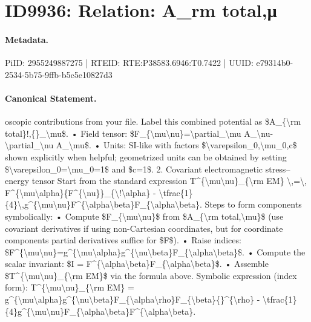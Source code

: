 \section*{ID9936: Relation: A\_rm total,μ}
\paragraph{Metadata.}
PiID: 2955249887275 | RTEID: RTE:P38583.6946:T0.7422 | UUID: e79314b0-2534-5b75-9ffb-b5c5e10827d3

\paragraph{Canonical Statement.}
oscopic contributions from your file. Label this combined potential as \$A\_\{\textbackslash{}rm total\}!,\{\}\_\textbackslash{}mu\$. • Field tensor: \$F\_\{\textbackslash{}mu\textbackslash{}nu\}=\textbackslash{}partial\_\textbackslash{}mu A\_\textbackslash{}nu-\textbackslash{}partial\_\textbackslash{}nu A\_\textbackslash{}mu\$. • Units: SI-like with factors \$\textbackslash{}varepsilon\_0,\textbackslash{}mu\_0,c\$ shown explicitly when helpful; geometrized units can be obtained by setting \$\textbackslash{}varepsilon\_0=\textbackslash{}mu\_0=1\$ and \$c=1\$. 2. Covariant electromagnetic stress–energy tensor Start from the standard expression T\textasciicircum{}\{\textbackslash{}mu\textbackslash{}nu\}\_\{\textbackslash{}rm EM\} \textbackslash{},=\textbackslash{}, F\textasciicircum{}\{\textbackslash{}mu\textbackslash{}alpha\}\{F\textasciicircum{}\{\textbackslash{}nu\}\}\_\{\textbackslash{}!\textbackslash{}alpha\} - \textbackslash{}tfrac\{1\}\{4\}\textbackslash{},g\textasciicircum{}\{\textbackslash{}mu\textbackslash{}nu\}F\textasciicircum{}\{\textbackslash{}alpha\textbackslash{}beta\}F\_\{\textbackslash{}alpha\textbackslash{}beta\}. Steps to form components symbolically: • Compute \$F\_\{\textbackslash{}mu\textbackslash{}nu\}\$ from \$A\_\{\textbackslash{}rm total,\textbackslash{}mu\}\$ (use covariant derivatives if using non-Cartesian coordinates, but for coordinate components partial derivatives suffice for \$F\$). • Raise indices: \$F\textasciicircum{}\{\textbackslash{}mu\textbackslash{}nu\}=g\textasciicircum{}\{\textbackslash{}mu\textbackslash{}alpha\}g\textasciicircum{}\{\textbackslash{}nu\textbackslash{}beta\}F\_\{\textbackslash{}alpha\textbackslash{}beta\}\$. • Compute the scalar invariant: \$I = F\textasciicircum{}\{\textbackslash{}alpha\textbackslash{}beta\}F\_\{\textbackslash{}alpha\textbackslash{}beta\}\$. • Assemble \$T\textasciicircum{}\{\textbackslash{}mu\textbackslash{}nu\}\_\{\textbackslash{}rm EM\}\$ via the formula above. Symbolic expression (index form): T\textasciicircum{}\{\textbackslash{}mu\textbackslash{}nu\}\_\{\textbackslash{}rm EM\} = g\textasciicircum{}\{\textbackslash{}mu\textbackslash{}alpha\}g\textasciicircum{}\{\textbackslash{}nu\textbackslash{}beta\}F\_\{\textbackslash{}alpha\textbackslash{}rho\}F\_\{\textbackslash{}beta\}\{\}\textasciicircum{}\{\textbackslash{}rho\} - \textbackslash{}tfrac\{1\}\{4\}g\textasciicircum{}\{\textbackslash{}mu\textbackslash{}nu\}F\_\{\textbackslash{}alpha\textbackslash{}beta\}F\textasciicircum{}\{\textbackslash{}alpha\textbackslash{}beta\}.

